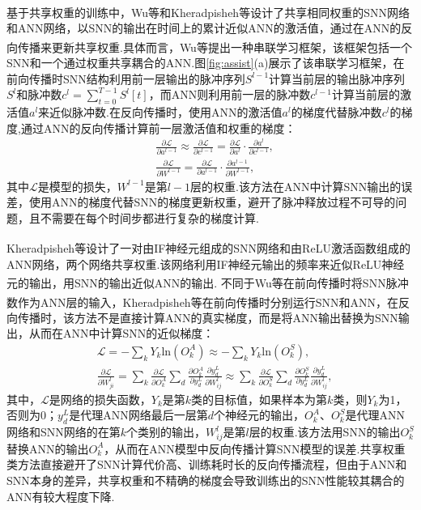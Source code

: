 \documentclass[10.5pt,compsoc,UTF8]{CjC}
\theoremstyle{mystyle}
\newcommand{\upcite}[1]{\textsuperscript{\cite{#1}}}
\begin{document}
\begin{multicols}{1}
基于共享权重的训练中，Wu等\upcite{wu2021tandem}和Kheradpisheh等\upcite{kheradpisheh2022spiking}设计了共享相同权重的SNN网络和ANN网络，以SNN的输出在时间上的累计近似ANN的激活值，通过在ANN的反向传播来更新共享权重.具体而言，Wu等\upcite{wu2021tandem}提出一种串联学习框架，该框架包括一个SNN和一个通过权重共享耦合的ANN.图\ref{fig:assist}(a)展示了该串联学习框架，在前向传播时SNN结构利用前一层输出的脉冲序列$S^{l-1}$计算当前层的输出脉冲序列$S^l$和脉冲数$c^l=\sum_{t=0}^{T-1} S^l[t]$，而ANN则利用前一层的脉冲数$c^{l-1}$计算当前层的激活值$a^l$来近似脉冲数.在反向传播时，使用ANN的激活值$a^l$的梯度代替脉冲数$c^l$的梯度,通过ANN的反向传播计算前一层激活值和权重的梯度：
\begin{align}
	&\frac{\partial \mathcal{L}}{\partial a^{l-1}} \approx \frac{\partial \mathcal{L}}{\partial c^{l-1}} = \frac{\partial \mathcal{L}}{\partial a^l} \cdot \frac{\partial a^l}{\partial c^{l-1}},\\
	&\frac{\partial \mathcal{L}}{\partial W^{l-1}} =  \frac{\partial \mathcal{L}}{\partial a^{l-1}} \cdot \frac{\partial a^{l-1}}{\partial W^{l-1}},
\end{align}
其中$\mathcal{L}$是模型的损失，$W^{l-1}$是第$l-1$层的权重.该方法在ANN中计算SNN输出的误差，使用ANN的梯度代替SNN的梯度更新权重，避开了脉冲释放过程不可导的问题，且不需要在每个时间步都进行复杂的梯度计算.

Kheradpisheh等\upcite{kheradpisheh2022spiking}设计了一对由IF神经元组成的SNN网络和由ReLU激活函数组成的ANN网络，两个网络共享权重.该网络利用IF神经元输出的频率来近似ReLU神经元的输出，用SNN的输出近似ANN的输出.
不同于Wu等\upcite{wu2021tandem}在前向传播时将SNN脉冲数作为ANN层的输入，Kheradpisheh等\upcite{kheradpisheh2022spiking}在前向传播时分别运行SNN和ANN，在反向传播时，该方法不是直接计算ANN的真实梯度，而是将ANN输出替换为SNN输出，从而在ANN中计算SNN的近似梯度：
\begin{align}
	&\mathcal{L}=-\sum_k{Y_{k}\mathrm{ln}(O_k^A)}\approx-\sum_k{Y_{k}\mathrm{ln}(O_k^S)},\\
	&\frac{\partial \mathcal{L}}{\partial W^l_{ji}}=\sum_k{\frac{\partial \mathcal{L}}{\partial O^A_{k}}\sum_d{\frac{\partial O^A_k}{\partial y^L_d}\frac{\partial y^L_d}{\partial W^l_{ij}}}}\approx \sum_k{\frac{\partial \mathcal{L}}{\partial O^S_{k}}\sum_d{\frac{\partial O^S_k}{\partial y^L_d}\frac{\partial y^L_d}{\partial W^l_{ij}}}},
\end{align}
其中，$\mathcal{L}$是网络的损失函数，$Y_k$是第$k$类的目标值，如果样本为第$k$类，则$Y_k$为1，否则为0；$y^L_{d}$是代理ANN网络最后一层第$d$个神经元的输出，$O^A_k$、$O^S_k$是代理ANN网络和SNN网络的在第$k$个类别的输出，$W^l_{ij}$是第$l$层的权重.该方法用SNN的输出$O^S_k$替换ANN的输出$O^A_k$，从而在ANN模型中反向传播计算SNN模型的误差.共享权重类方法直接避开了SNN计算代价高、训练耗时长的反向传播流程，但由于ANN和SNN本身的差异，共享权重和不精确的梯度会导致训练出的SNN性能较其耦合的ANN有较大程度下降.


\end{multicols}
\end{document}
